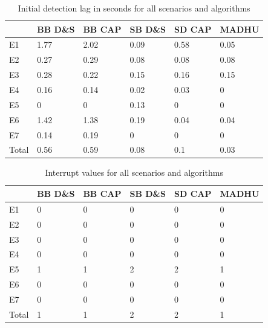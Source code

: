 \begin{appendix}
\begin{table}[!ht]
\centering

\begin{tabular}{l|ll|ll|l}
\toprule
      & BB D\&S & BB CAP & SB D\&S & SD CAP & MADHU \\ \midrule
E1    & 1.77    & 2.02   & 0.09    & 0.58   & 0.05  \\
E2    & 0.27    & 0.29   & 0.08    & 0.08   & 0.08  \\
E3    & 0.28    & 0.22   & 0.15    & 0.16   & 0.15  \\
E4    & 0.16    & 0.14   & 0.02    & 0.03   & 0     \\
E5    & 0       & 0      & 0.13    & 0      & 0     \\
E6    & 1.42    & 1.38   & 0.19    & 0.04   & 0.04  \\
E7    & 0.14    & 0.19   & 0       & 0      & 0     \\ \midrule
Total & 0.56    & 0.59   & 0.08    & 0.1    & 0.03  \\ \bottomrule
\end{tabular}
\caption{Initial detection lag in seconds for all scenarios and algorithms}
\label{tab:lag}
\end{table}


\begin{table}[!ht]
\centering
\begin{tabular}{l|ll|ll|l}
\toprule
      & BB D\&S & BB CAP & SB D\&S & SD CAP & MADHU \\\midrule
E1    & 0     & 0      & 0     & 0      & 0     \\
E2    & 0     & 0      & 0     & 0      & 0     \\
E3    & 0     & 0      & 0     & 0      & 0     \\
E4    & 0     & 0      & 0     & 0      & 0     \\
E5    & 1     & 1      & 2     & 2      & 1     \\
E6    & 0     & 0      & 0     & 0      & 0     \\
E7    & 0     & 0      & 0     & 0      & 0     \\ \midrule
Total & 1     & 1      & 2     & 2      & 1    \\
\bottomrule
\end{tabular}
\caption{Interrupt values for all scenarios and algorithms}
\label{tab:interrupts}
\end{table}


\end{appendix}
